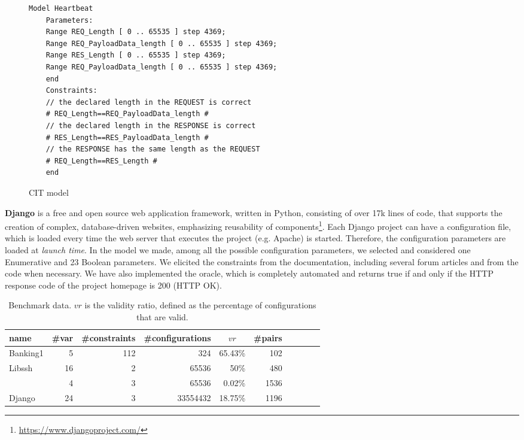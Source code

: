\begin{tikzborder}{\cite{Gargantini16:validation}}
\begin{asparaenum}
		\begin{figure}[h]
			\begin{lstlisting}[language=comb,basicstyle=\sffamily\footnotesize]
	Model Heartbeat
	Parameters:
	Range REQ_Length [ 0 .. 65535 ] step 4369;
	Range REQ_PayloadData_length [ 0 .. 65535 ] step 4369;
	Range RES_Length [ 0 .. 65535 ] step 4369;
	Range REQ_PayloadData_length [ 0 .. 65535 ] step 4369;
	end
	Constraints:
	// the declared length in the REQUEST is correct
	# REQ_Length==REQ_PayloadData_length #
	// the declared length in the RESPONSE is correct
	# RES_Length==RES_PayloadData_length #
	// the RESPONSE has the same length as the REQUEST
	# REQ_Length==RES_Length #	
	end
			\end{lstlisting}
			\caption{\TLSChecker CIT model}
			\label{fig:TLSChecker}
		\end{figure}
		
		
		\item \textbf{Django}  is a free and open source web application framework, written in Python, consisting of over 17k lines of code, that supports the creation of complex, database-driven websites, emphasizing reusability of components\footnote{\url{https://www.djangoproject.com/}}. Each Django project can have a configuration file, which is loaded every time the web server that executes the project (e.g. Apache) is started. Therefore, the configuration parameters are loaded at \emph{launch time}.
		In the model we made, among all the possible configuration parameters, we selected and considered one Enumerative and 23 Boolean parameters. We elicited the constraints from the documentation, including several forum articles and from the code when necessary. We have also implemented the oracle, which is completely automated and returns true if and only if the HTTP response code of the project homepage is 200 (HTTP OK).
	\end{asparaenum}
	\be
	
	\begin{table}[h]
		\caption{Benchmark data. {\footnotesize $vr$ is the validity ratio, defined as the percentage of configurations that are valid.}}\label{tab:validation_benchmarks}
		\centering
		\begin{tabular}{lrrrrrrrrr}
			\toprule
			name & \#var & \multicolumn{1}{c}{\#constraints} &\multicolumn{1}{c}{\#configurations} & \multicolumn{1}{c}{$vr$} & \multicolumn{1}{c}{\#pairs}\\ 
			\midrule
			Banking1 & 5 & 112 & 324 & 65.43\% &  102  \\ 
			Libssh &  16 & 2 &  65536  & 50\% & 480 \\ 
			\TLSChecker & 4 & 3 & 65536 & 0.02\% & 1536 \\ 
			Django & 24 & 3 &  33554432 & 18.75\% & 1196\\
			\bottomrule
		\end{tabular}
	\end{table}
	

\end{tikzborder}
